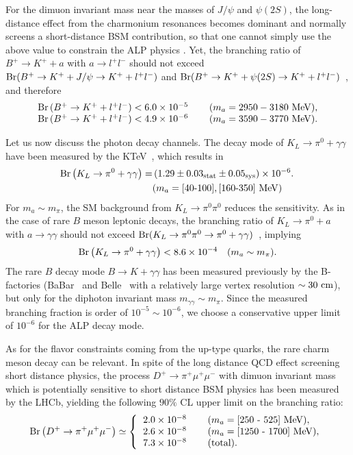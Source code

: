 \documentclass[preprint,prd,aps,tighten,nofootinbib,amssymb]{revtex4}
\newcommand{\bea}{\begin{eqnarray}}
\newcommand{\eea}{\end{eqnarray}}
\newcommand{\dis}[1]{\begin{equation}\begin{split}#1\end{split}\end{equation}}
\begin{document}
For the dimuon invariant mass  near the masses of $J\slash\psi$ and $\psi(2S)$, the long-distance effect from the charmonium resonances becomes dominant and normally screens a short-distance BSM contribution, so that one cannot simply use the above value to constrain the ALP physics \cite{Aaij:2015tna, Aaij:2016qsm, Aaij:2016cbx}. 
Yet, the branching ratio of $B^+\rightarrow K^+ + a$ with $a \rightarrow l^+ l^-$ should not exceed  ${\rm Br}(B^+\rightarrow K^+ + J\slash \psi \rightarrow K^+ + l^+l^-)$ and ${\rm Br}(B^+\rightarrow K^+ + \psi(2S)\rightarrow K^+ + l^+l^-)$~\cite{Olive:2016xmw},  and therefore 
\bea
\left.
\begin{tabular}{ll}
${\rm Br}\left(B^+ \rightarrow K^+ + l^+l^- \right) < 6.0  \times 10^{-5}  $ & $\quad (m_a=2950-3180~{\rm MeV})$, \\
${\rm Br}\left(B^+ \rightarrow K^+ + l^+l^- \right) < 4.9 \times 10^{-6}   $ & $\quad (m_a=3590-3770~{\rm MeV})$.
\end{tabular} 
\right.
\eea

Let us now discuss the photon decay channels.
The decay mode of $K_L \rightarrow \pi^0 + \gamma\gamma$ have been measured by the KTeV~\cite{Abouzaid:2008xm}, which results in 
\dis{
{\rm Br}\left(K_L \rightarrow \pi^0 + \gamma\gamma \right) = &\left(1.29\pm 0.03_{\rm stat} \pm 0.05_{\rm sys}\right)  \times 10^{-6}. \, \\ &(m_a=[40\text{-}100],[160\text{-}350]~{\rm MeV}) 
}
For $m_a \sim m_\pi$, the SM background from $K_L \rightarrow \pi^0\pi^0$ reduces the sensitivity.
As in the case of rare $B$ meson leptonic decays, the branching ratio of $K_L \rightarrow \pi^0+a$ with $a \rightarrow\gamma\gamma$ should not exceed  ${\rm Br}(K_L \rightarrow \pi^0\pi^0\rightarrow \pi^0 + \gamma\gamma)$~\cite{Olive:2016xmw,Alexopoulos:2004sx}, implying  
\bea
{\rm Br}\left(K_L \rightarrow \pi^0 + \gamma\gamma \right) <8.6  \times 10^{-4}  \quad (m_a\sim m_\pi).
\eea
The rare $B$ decay mode $B\rightarrow K +\gamma\gamma$ has been measured previously by the B-factories (BaBar~\cite{Aubert:2007hh} and Belle~\cite{Duh:2012ie} with a relatively large vertex resolution $\sim 30 ~{\rm cm}$), but
only for the diphoton invariant mass $m_{\gamma\gamma} \sim m_\pi$.
Since the measured branching fraction is order of $10^{-5} \sim 10^{-6}$, we choose a conservative upper limit of $10^{-6}$ for the ALP decay mode.

As for the flavor constraints coming from the up-type quarks, the rare charm meson decay can be relevant.
In spite of the long distance  QCD effect screening short distance physics, the process $D^+ \rightarrow \pi^+ \mu^+\mu^-$ with  dimuon invariant mass which is potentially sensitive to short distance BSM physics has been measured by the LHCb,  yielding the following  $90\%$ CL upper limit on the branching ratio:
\bea
{\rm Br}\left(D^+ \rightarrow \pi^+ \mu^+\mu^-\right) \simeq \left\{ 
\begin{tabular}{ll}
$2.0  \times 10^{-8}$ & \quad$(m_a = [250$ - $525]~{\rm MeV}),$\\
$2.6 \times 10^{-8} $ & \quad$(m_a = [1250$ - $1700]~{\rm MeV}),$\\
$7.3 \times 10^{-8} $ & \quad (total).
\end{tabular}
\right.
\eea
\end{document}
